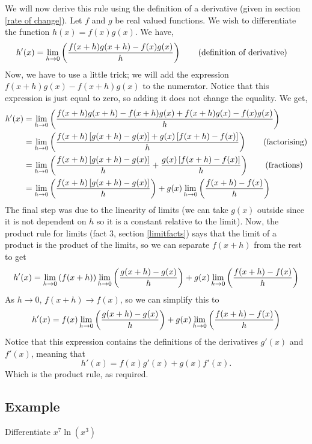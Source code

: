 \noindent We will now derive this rule using the definition of a derivative (given in section \ref{rate of change}). Let $f$ and $g$ be real valued functions. We wish to differentiate the function $h(x) = f(x)g(x)$. We have,
\begin{align*}
h'(x) &  = \lim_{h\rightarrow0}\left(\frac{f(x+h)g(x+h) - f(x)g(x)}{h}\right) \tag{definition of derivative}
\end{align*}
Now, we have to use a little trick; we will add the expression $f(x+h)g(x) - f(x+h)g(x)$ to the numerator. Notice that this expression is just equal to zero, so adding it does not change the equality. We get,
\begin{align*}
h'(x) &  = \lim_{h\rightarrow0}\left(\frac{f(x+h)g(x+h) - f(x+h)g(x) + f(x+h)g(x) - f(x)g(x)}{h}\right) \\
	& =  \lim_{h\rightarrow0}\left(\frac{f(x+h)\left[g(x+h) - g(x)\right] + g(x)\left[f(x+h) - f(x)\right]}{h}\right) \tag{factorising} \\
	& = \lim_{h\rightarrow0}\left(\frac{f(x+h)\left[g(x+h) - g(x)\right]}{h} + \frac{g(x)\left[f(x+h) - f(x)\right]}{h}\right) \tag{fractions} \\
	& =  \lim_{h\rightarrow0}\left(\frac{f(x+h)\left[g(x+h) - g(x)\right]}{h}\right) + g(x)\lim_{h\rightarrow0}\left(\frac{f(x+h) - f(x)}{h}\right)
\end{align*}
The final step was due to the linearity of limits (we can take $g(x)$ outside since it is not dependent on $h$ so it is a constant relative to the limit). Now, the product rule for limits (fact 3, section \ref{limitfacts}) says that the limit of a product is the product of the limits, so we can separate $f(x+h)$ from the rest to get
\[
h'(x) = \lim_{h\rightarrow0}\left(f(x+h)\right)\lim_{h\rightarrow0}\left(\frac{g(x+h) - g(x)}{h}\right) + g(x)\lim_{h\rightarrow0}\left(\frac{f(x+h) - f(x)}{h}\right)
\]
As $h \rightarrow 0$, $f(x + h) \rightarrow f(x)$, so we can simplify this to
\[
h'(x) = f(x)\lim_{h\rightarrow0}\left(\frac{g(x+h) - g(x)}{h}\right) + g(x)\lim_{h\rightarrow0}\left(\frac{f(x+h) - f(x)}{h}\right)
\]
Notice that this expression contains the definitions of the derivatives $g'(x)$ and $f'(x)$, meaning that
\[
h'(x) = f(x)g'(x) + g(x)f'(x).
\] 
Which is the product rule, as required.

\subsection{Example}
Differentiate $x^7\ln(x^3)$ \\

